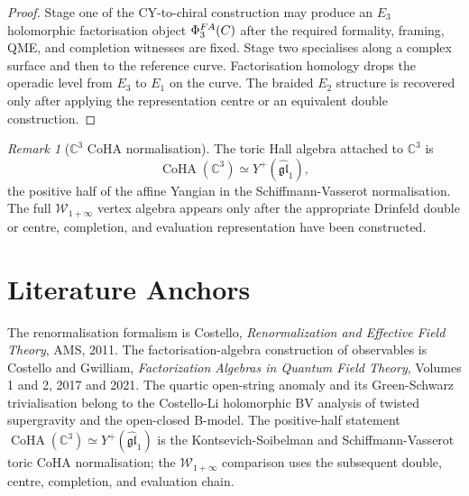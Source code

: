 \documentclass[11pt]{amsart}
\providecommand{\C}{\mathbb{C}}
\providecommand{\CoHA}{\operatorname{CoHA}}
\providecommand{\Ethree}{E_3}
\providecommand{\PhiFA}{\Phi^{\mathrm{FA}}}
\providecommand{\Yp}{Y^{+}}
\providecommand{\Woneinf}{\mathcal{W}_{1+\infty}}
\theoremstyle{plain}
\theoremstyle{definition}
\theoremstyle{remark}
\newtheorem{remark}[theorem]{Remark}
\begin{document}
\begin{proof}
Stage one of the CY-to-chiral construction may produce an
$\Ethree$ holomorphic factorisation object
$\PhiFA_3(\cC)$ after the required formality, framing, QME, and
completion witnesses are fixed.  Stage two specialises along a complex
surface and then to the reference curve.  Factorisation homology drops
the operadic level from $E_3$ to $E_1$ on the curve.  The braided
$E_2$ structure is recovered only after applying the representation
centre or an equivalent double construction.
\end{proof}

\begin{remark}[$\C^3$ CoHA normalisation]
\label{rem:c3-coha-normalisation}
The toric Hall algebra attached to $\C^3$ is
\[
  \CoHA(\C^3)\simeq \Yp(\widehat{\mathfrak{gl}}_1),
\]
the positive half of the affine Yangian in the
Schiffmann-Vasserot normalisation.  The full $\Woneinf$ vertex algebra
appears only after the appropriate Drinfeld double or centre,
completion, and evaluation representation have been constructed.
\end{remark}

\section{Literature Anchors}
\label{sec:literature-anchors}

The renormalisation formalism is Costello, \emph{Renormalization and
Effective Field Theory}, AMS, 2011.  The factorisation-algebra
construction of observables is Costello and Gwilliam, \emph{Factorization
Algebras in Quantum Field Theory}, Volumes 1 and 2, 2017 and 2021.  The
quartic open-string anomaly and its Green-Schwarz trivialisation belong
to the Costello-Li holomorphic BV analysis of twisted supergravity and
the open-closed B-model.  The positive-half statement
$\CoHA(\C^3)\simeq \Yp(\widehat{\mathfrak{gl}}_1)$ is the
Kontsevich-Soibelman and Schiffmann-Vasserot toric CoHA normalisation;
the $\Woneinf$ comparison uses the subsequent double, centre,
completion, and evaluation chain.
\end{document}
